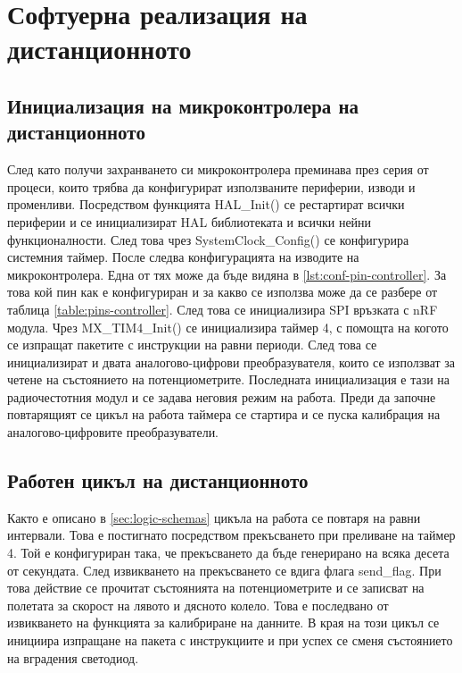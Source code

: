 \section{Софтуерна реализация на дистанционното}
\label{sec:software-controller}


\subsection{Инициализация на микроконтролера на дистанционното}
\label{ssec:init-controller}

След като получи захранването си микроконтролера преминава през серия от процеси, които трябва да конфигурират използваните периферии, изводи и променливи. Посредством функцията HAL\_Init() се рестартират всички периферии и се инициализират HAL библиотеката и всички нейни функционалности. След това чрез SystemClock\_Config() се конфигурира системния таймер. После следва конфигурацията на изводите на микроконтролера. Една от тях може да бъде видяна в \autoref{lst:conf-pin-controller}. За това кой пин как е конфигуриран и за какво се използва може да се разбере от таблица \cref{table:pins-controller}. След това се инициализира SPI връзката с nRF модула. Чрез MX\_TIM4\_Init() се инициализира таймер 4, с помощта на когото се изпращат пакетите с инструкции на равни периоди. След това се инициализират и двата аналогово-цифрови преобразувателя, които се използват за четене на състоянието на потенциометрите. Последната инициализация е тази на радиочестотния модул и се задава неговия режим на работа. Преди да започне повтарящият се цикъл на работа таймера се стартира и се пуска калибрация на аналогово-цифровите преобразуватели.





\subsection{Работен цикъл на дистанционното}
\label{ssec:loop-controller}

Както е описано в \cref{sec:logic-schemas} цикъла на работа се повтаря на равни интервали. Това е постигнато посредством прекъсването при преливане на таймер 4. Той е конфигуриран така, че прекъсването да бъде генерирано на всяка десета от секундата. След извикването на прекъсването се вдига флага send\_flag. При това действие се прочитат състоянията на потенциометрите и се записват на полетата за скорост на лявото и дясното колело. Това е последвано от извикването на функцията за калибриране на данните. В края на този цикъл се инициира изпращане на пакета с инструкциите и при успех се сменя състоянието на вградения светодиод.

